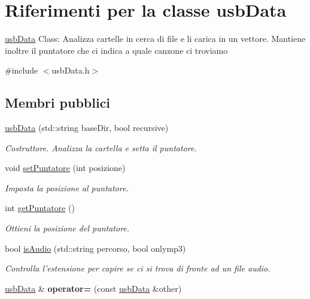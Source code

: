 \hypertarget{classusbData}{\section{\-Riferimenti per la classe usb\-Data}
\label{classusbData}
}


\hyperlink{classusbData}{usb\-Data} \-Class\-: \-Analizza cartelle in cerca di file e li carica in un vettore. \-Mantiene inoltre il puntatore che ci indica a quale canzone ci troviamo  




{\ttfamily \#include $<$usb\-Data.\-h$>$}

\subsection*{\-Membri pubblici}
\begin{DoxyCompactItemize}
\item 
\hyperlink{classusbData_afd7ef352616d15a05bca0e56f46e52a0}{usb\-Data} (std\-::string base\-Dir, bool recursive)
\begin{DoxyCompactList}\small\item\em \-Costruttore. \-Analizza la cartella e setta il puntatore. \end{DoxyCompactList}\item 
void \hyperlink{classusbData_a7fc551ced09d43cb53c94ca9f154c6a9}{set\-Puntatore} (int posizione)
\begin{DoxyCompactList}\small\item\em \-Imposta la posizione al puntatore. \end{DoxyCompactList}\item 
int \hyperlink{classusbData_a3d872ce11202a145b83f0791d7eefebb}{get\-Puntatore} ()
\begin{DoxyCompactList}\small\item\em \-Ottieni la posizione del puntatore. \end{DoxyCompactList}\item 
bool \hyperlink{classusbData_a7405fda9e90402594fe24dc091bad0ec}{is\-Audio} (std\-::string percorso, bool onlymp3)
\begin{DoxyCompactList}\small\item\em \-Controlla l'estensione per capire se ci si trova di fronte ad un file audio. \end{DoxyCompactList}\item 
\hypertarget{classusbData_a25ecbfcbc9001a3626b8ad55199bc667}{\hyperlink{classusbData}{usb\-Data} \& {\bfseries operator=} (const \hyperlink{classusbData}{usb\-Data} \&other)}\label{classusbData_a25ecbfcbc9001a3626b8ad55199bc667}

\end{DoxyCompactItemize}
